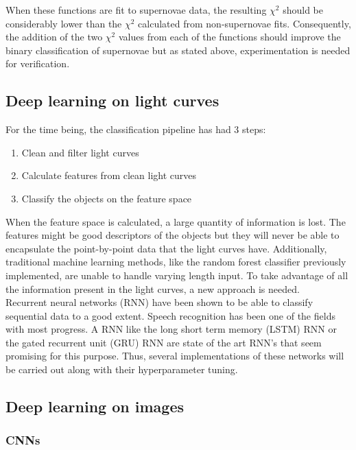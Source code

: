 When these functions are fit to supernovae data, the resulting $\chi^2$ should be considerably lower than the $\chi^2$ calculated from non-supernovae fits. Consequently, the addition of the two $\chi^2$  values from each of the functions should improve the binary classification of supernovae but as stated above, experimentation is needed for verification.

\subsection{Deep learning on light curves}

For the time being, the classification pipeline has had 3 steps:

\begin{enumerate}
  \item Clean and filter light curves
  \item Calculate features from clean light curves
  \item Classify the objects on the feature space
\end{enumerate}

When the feature space is calculated, a large quantity of information is lost. The features might be good descriptors of the objects but they will never be able to encapsulate the point-by-point data that the light curves have. Additionally, traditional machine learning methods, like the random forest classifier previously implemented, are unable to handle varying length input. To take advantage of all the information present in the light curves, a new approach is needed.\\

Recurrent neural networks (RNN) have been shown to be able to classify sequential data to a good extent. Speech recognition has been one of the fields with most progress\cite{RNN}. A RNN like the long short term memory (LSTM) RNN or the gated recurrent unit (GRU) RNN are state of the art RNN's that seem promising for this purpose. Thus, several implementations of these networks will be carried out along with their hyperparameter tuning. 

\subsection{Deep learning on images}

\subsubsection{CNNs}

